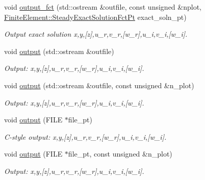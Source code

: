 \begin{DoxyCompactItemize}
void \hyperlink{classoomph_1_1PMLTimeHarmonicLinearElasticityEquations_ae0be2b91337f92f2a65536446a050609}{output\+\_\+fct} (std\+::ostream \&outfile, const unsigned \&nplot, \hyperlink{classoomph_1_1FiniteElement_a690fd33af26cc3e84f39bba6d5a85202}{Finite\+Element\+::\+Steady\+Exact\+Solution\+Fct\+Pt} exact\+\_\+soln\+\_\+pt)
\begin{DoxyCompactList}\small\item\em Output exact solution x,y,\mbox{[}z\mbox{]},u\+\_\+r,v\+\_\+r,\mbox{[}w\+\_\+r\mbox{]},u\+\_\+i,v\+\_\+i,\mbox{[}w\+\_\+i\mbox{]}. \end{DoxyCompactList}\item 
void \hyperlink{classoomph_1_1PMLTimeHarmonicLinearElasticityEquations_ab033b94bb8665cb782011cf4f12824e9}{output} (std\+::ostream \&outfile)
\begin{DoxyCompactList}\small\item\em Output\+: x,y,\mbox{[}z\mbox{]},u\+\_\+r,v\+\_\+r,\mbox{[}w\+\_\+r\mbox{]},u\+\_\+i,v\+\_\+i,\mbox{[}w\+\_\+i\mbox{]}. \end{DoxyCompactList}\item 
void \hyperlink{classoomph_1_1PMLTimeHarmonicLinearElasticityEquations_a0c7fe3f1d343009a7289fd85becc58a6}{output} (std\+::ostream \&outfile, const unsigned \&n\+\_\+plot)
\begin{DoxyCompactList}\small\item\em Output\+: x,y,\mbox{[}z\mbox{]},u\+\_\+r,v\+\_\+r,\mbox{[}w\+\_\+r\mbox{]},u\+\_\+i,v\+\_\+i,\mbox{[}w\+\_\+i\mbox{]}. \end{DoxyCompactList}\item 
void \hyperlink{classoomph_1_1PMLTimeHarmonicLinearElasticityEquations_a4f333b308aa6bfd8e70a458574ed47fe}{output} (F\+I\+LE $\ast$file\+\_\+pt)
\begin{DoxyCompactList}\small\item\em C-\/style output\+: x,y,\mbox{[}z\mbox{]},u\+\_\+r,v\+\_\+r,\mbox{[}w\+\_\+r\mbox{]},u\+\_\+i,v\+\_\+i,\mbox{[}w\+\_\+i\mbox{]}. \end{DoxyCompactList}\item 
void \hyperlink{classoomph_1_1PMLTimeHarmonicLinearElasticityEquations_a27d100b419a9dfde06275bd3c3c73681}{output} (F\+I\+LE $\ast$file\+\_\+pt, const unsigned \&n\+\_\+plot)
\begin{DoxyCompactList}\small\item\em Output\+: x,y,\mbox{[}z\mbox{]},u\+\_\+r,v\+\_\+r,\mbox{[}w\+\_\+r\mbox{]},u\+\_\+i,v\+\_\+i,\mbox{[}w\+\_\+i\mbox{]}. \end{DoxyCompactList}\item 

\end{DoxyCompactItemize}
